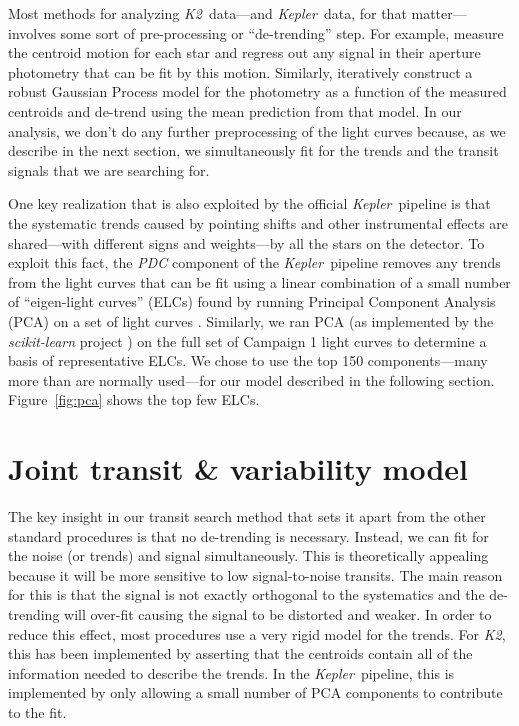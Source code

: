 \documentclass[12pt,preprint]{aastex}
\newcommand{\project}[1]{\textsl{#1}} %
\newcommand{\kepler}{\project{Kepler}}
\newcommand{\KT}{\project{K2}}
\newcommand{\figref}[1]{\ref{fig:#1}}
\newcommand{\Fig}[1]{Figure~\figref{#1}}
\begin{document}
Most methods for analyzing \KT\ data---and \kepler\ data, for that
matter---involves some sort of pre-processing or ``de-trending'' step.
For example, \citet{vanderberg-a} measure the centroid motion for each star
and regress out any signal in their aperture photometry that can be fit by
this motion.
Similarly, \citet{crossfield} iteratively construct a robust Gaussian Process
model for the photometry as a function of the measured centroids and de-trend
using the mean prediction from that model.
In our analysis, we don't do any further preprocessing of the light curves
because, as we describe in the next section, we simultaneously fit for the
trends and the transit signals that we are searching for.

One key realization that is also exploited by the official \kepler\ pipeline
is that the systematic trends caused by pointing shifts and other instrumental
effects are shared---with different signs and weights---by all the stars on
the detector.
To exploit this fact, the \project{PDC} component of the \kepler\ pipeline
removes any trends from the light curves that can be fit using a linear
combination of a small number of ``eigen-light curves'' (ELCs) found by
running Principal Component Analysis (PCA) on a set of light curves
\citep{map-pdc1, map-pdc2}.
Similarly, we ran PCA (as implemented by the \project{scikit-learn} project
\citealt{sklearn}) on the full set of Campaign 1 light curves to determine a
basis of representative ELCs.
We chose to use the top 150 components---many more than are normally
used---for our model described in the following section.
\Fig{pca} shows the top few ELCs.


\section{Joint transit \& variability model}

The key insight in our transit search method that sets it apart from the
other standard procedures is that no de-trending is necessary.
Instead, we can fit for the noise (or trends) and signal simultaneously.
This is theoretically appealing because it will be more sensitive to low
signal-to-noise transits.
The main reason for this is that the signal is not exactly orthogonal to the
systematics and the de-trending will over-fit causing the signal to be
distorted and weaker.
In order to reduce this effect, most procedures use a very rigid model for
the trends.
For \KT, this has been implemented by asserting that the centroids contain
all of the information needed to describe the trends.
In the \kepler\ pipeline, this is implemented by only allowing a small number
of PCA components to contribute to the fit.
\end{document}

